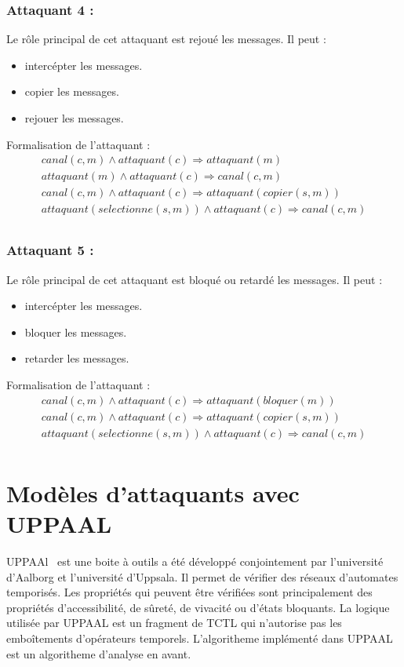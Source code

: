 \documentclass[10pt,a4paper]{article}
\begin{document}
\subsubsection{Attaquant 4 :}
Le rôle principal de cet attaquant est rejoué les messages. Il peut :
\begin{itemize}
\item intercépter les messages.
\item copier les messages.
\item rejouer les messages.\\
\end{itemize}
Formalisation de l'attaquant :   
\[
\begin{array}{l}
canal(c,m)\wedge attaquant(c)\Longrightarrow attaquant(m)\\
attaquant(m)\wedge attaquant(c)\Longrightarrow canal(c,m)\\
canal(c,m)\wedge attaquant(c)\Longrightarrow attaquant(copier(s,m))\\
attaquant(selectionne(s,m))\wedge attaquant(c)\Longrightarrow canal(c,m)\\  
  
  \end{array}
\]

\subsubsection{Attaquant 5 :}
Le rôle principal de cet attaquant est bloqué ou retardé les messages. Il peut :
\begin{itemize}
\item intercépter les messages.
\item bloquer les messages.
\item retarder les messages.\\
\end{itemize}
Formalisation de l'attaquant :   
\[
\begin{array}{l}
canal(c,m)\wedge attaquant(c)\Longrightarrow attaquant(bloquer(m))\\
canal(c,m)\wedge attaquant(c)\Longrightarrow attaquant(copier(s,m))\\
attaquant(selectionne(s,m))\wedge attaquant(c)\Longrightarrow canal(c,m)\\
\end{array}
\]

\section{Modèles d'attaquants avec UPPAAL}
UPPAAl~\cite{ref4} est une boite à outils a été développé conjointement par l'université d'Aalborg et l'université d'Uppsala. Il permet de vérifier des réseaux d'automates temporisés. Les propriétés qui peuvent \^{e}tre vérifiées sont principalement des propriétés d'accessibilité, de sûreté, de vivacité ou d'états bloquants. La logique utilisée par UPPAAL est un fragment de TCTL qui n'autorise pas les embo\^{i}tements d'opérateurs temporels. L'algoritheme implémenté dans UPPAAL est un algoritheme d'analyse en avant.   
\end{document}
